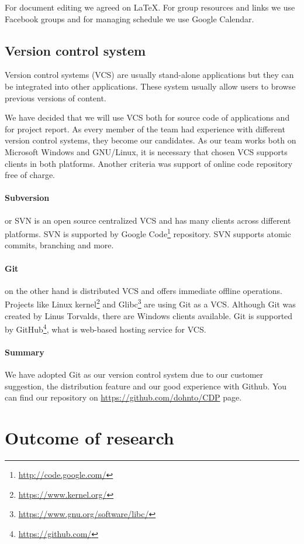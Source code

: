 For document editing we agreed on \LaTeX.
For group resources and links we use Facebook groups and for managing schedule we use Google Calendar.


\subsection{Version control system}
Version control systems (VCS) are usually stand-alone applications but they can be integrated into other applications. These system usually allow users to browse previous versions of content.

We have decided that we will use VCS both for source code of applications and for project report. As every member of the team had experience with different version control systems, they become our candidates.
As our team works both on Microsoft Windows and GNU/Linux, it is necessary that chosen VCS supports clients in both platforms.
Another criteria was support of online code repository free of charge.

\paragraph{Subversion} or SVN is an open source centralized VCS and has many clients across different platforms. 
SVN is supported by Google Code\footnote{\url{http://code.google.com/}} repository.
SVN supports atomic commits, branching and more.

\paragraph{Git} on the other hand is distributed VCS and offers immediate offline operations.
Projects like Linux kernel\footnote{\url{https://www.kernel.org/}} and Glibc\footnote{\url{https://www.gnu.org/software/libc/}} are using Git as a VCS.
Although Git was created by Linus Torvalds, there are Windows clients available.
Git is supported by GitHub\footnote{\url{https://github.com/}}, what is web-based hosting service for VCS.

\paragraph{Summary} We have adopted Git as our version control system due to our customer suggestion, the distribution feature and our good experience with Github.
You can find our repository on \url{https://github.com/dohnto/CDP} page.


\section{Outcome of research}
